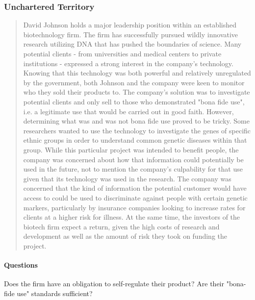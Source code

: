 \subsubsection{Unchartered Territory \cite{4_ut}}
\label{sec:ut}

\begin{quote}
  David Johnson holds a major leadership position within an established biotechnology firm. The firm has successfully pursued wildly innovative research utilizing DNA that has pushed the boundaries of science. Many potential clients - from universities and medical centers to private institutions - expressed a strong interest in the company's technology. Knowing that this technology was both powerful and relatively unregulated by the government, both Johnson and the company were keen to monitor who they sold their products to. The company's solution was to investigate potential clients and only sell to those who demonstrated "bona fide use", i.e. a legitimate use that would be carried out in good faith. However, determining what was and was not bona fide use proved to be tricky. Some researchers wanted to use the technology to investigate the genes of specific ethnic groups in order to understand common genetic diseases within that group. While this particular project was intended to benefit people, the company was concerned about how that information could potentially be used in the future, not to mention the company's culpability for that use given that its technology was used in the research. The company was concerned that the kind of information the potential customer would have access to could be used to discriminate against people with certain genetic markers, particularly by insurance companies looking to increase rates for clients at a higher risk for illness. At the same time, the investors of the biotech firm expect a return, given the high costs of research and development as well as the amount of risk they took on funding the project.
\end{quote}

\paragraph{Questions}{
  Does the firm have an obligation to self-regulate their product? Are their "bona-fide use" standards sufficient?
}

